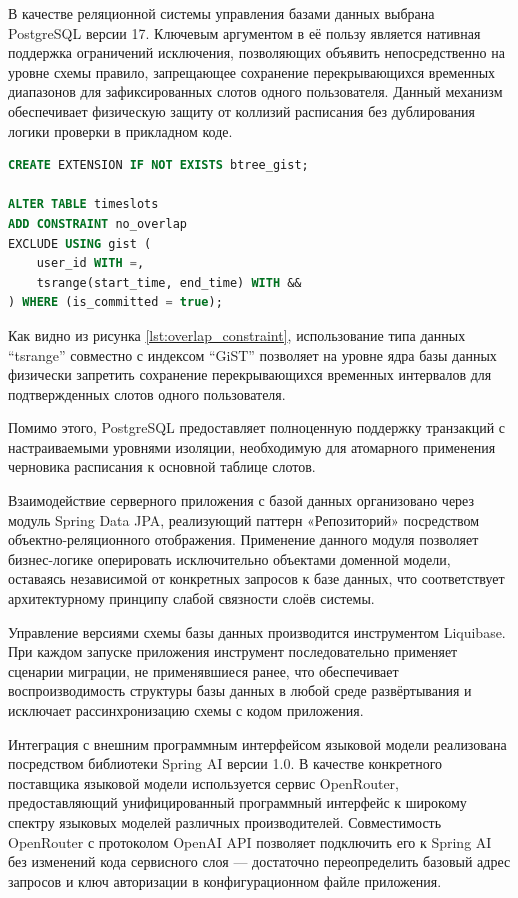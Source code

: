 \numberedparagraph
В качестве реляционной системы управления базами данных выбрана PostgreSQL версии 17. Ключевым аргументом в её пользу является нативная поддержка ограничений исключения, позволяющих объявить непосредственно на уровне схемы правило, запрещающее сохранение перекрывающихся временных диапазонов для зафиксированных слотов одного пользователя. Данный механизм обеспечивает физическую защиту от коллизий расписания без дублирования логики проверки в прикладном коде. 

\begin{samepage}
\begin{lstlisting}[language=SQL, basicstyle=\footnotesize\ttfamily, frame=single,
    caption={SQL-запрос создания ограничения исключения для временных слотов},
    label={lst:overlap_constraint}]
CREATE EXTENSION IF NOT EXISTS btree_gist;

ALTER TABLE timeslots
ADD CONSTRAINT no_overlap
EXCLUDE USING gist (
    user_id WITH =,
    tsrange(start_time, end_time) WITH &&
) WHERE (is_committed = true);
\end{lstlisting}
\end{samepage}

Как видно из рисунка \ref{lst:overlap_constraint}, использование типа данных ``tsrange'' совместно с индексом ``GiST'' позволяет на уровне ядра базы данных физически запретить сохранение перекрывающихся временных интервалов для подтвержденных слотов одного пользователя.

Помимо этого, PostgreSQL предоставляет полноценную поддержку транзакций с настраиваемыми уровнями изоляции, необходимую для атомарного применения черновика расписания к основной таблице слотов.

Взаимодействие серверного приложения с базой данных организовано через модуль Spring Data JPA, реализующий паттерн «Репозиторий» посредством объектно-реляционного отображения. Применение данного модуля позволяет бизнес-логике оперировать исключительно объектами доменной модели, оставаясь независимой от конкретных запросов к базе данных, что соответствует архитектурному принципу слабой связности слоёв системы.

Управление версиями схемы базы данных производится инструментом Liquibase. При каждом запуске приложения инструмент последовательно применяет сценарии миграции, не применявшиеся ранее, что обеспечивает воспроизводимость структуры базы данных в любой среде развёртывания и исключает рассинхронизацию схемы с кодом приложения.

\numberedparagraph
Интеграция с внешним программным интерфейсом языковой модели реализована посредством библиотеки Spring AI версии 1.0. В качестве конкретного поставщика языковой модели используется сервис OpenRouter, предоставляющий унифицированный программный интерфейс к широкому спектру языковых моделей различных производителей. Совместимость OpenRouter с протоколом OpenAI API позволяет подключить его к Spring AI без изменений кода сервисного слоя --- достаточно переопределить базовый адрес запросов и ключ авторизации в конфигурационном файле приложения.

